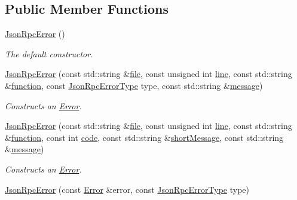 \subsection*{Public Member Functions}
\begin{DoxyCompactItemize}
\item 
\hyperlink{group___network_module_ga6177a0628073de16562fdbaf8ef12f33}{Json\+Rpc\+Error} ()
\begin{DoxyCompactList}\small\item\em The default constructor. \end{DoxyCompactList}\item 
\hyperlink{group___network_module_ga041044a45186dbc1faa970ec45ecba81}{Json\+Rpc\+Error} (const std\+::string \&\hyperlink{group___utility_module_ga0b75e32780cb8534179ff3c060739496}{file}, const unsigned int \hyperlink{group___utility_module_ga13437b5caffe754b7a32fc3c514907e5}{line}, const std\+::string \&\hyperlink{group___utility_module_gaa69c98222c56544a9094154a8eab4db9}{function}, const \hyperlink{namespacedg_1_1deepcore_1_1network_a396e76c62ff66c95c20af09d8e45ce44}{Json\+Rpc\+Error\+Type} type, const std\+::string \&\hyperlink{group___utility_module_ga7269ba8049ed86338733955565242539}{message})
\begin{DoxyCompactList}\small\item\em Constructs an \hyperlink{classdg_1_1deepcore_1_1_error}{Error}. \end{DoxyCompactList}\item 
\hyperlink{group___network_module_gad7b1e6630b2774ffa45cbcc88b9a1b3f}{Json\+Rpc\+Error} (const std\+::string \&\hyperlink{group___utility_module_ga0b75e32780cb8534179ff3c060739496}{file}, const unsigned int \hyperlink{group___utility_module_ga13437b5caffe754b7a32fc3c514907e5}{line}, const std\+::string \&\hyperlink{group___utility_module_gaa69c98222c56544a9094154a8eab4db9}{function}, const int \hyperlink{group___network_module_gab5f760ae09f901ed94e08ea1c0d26e50}{code}, const std\+::string \&\hyperlink{group___network_module_gab4cfbb46ab5f2ce706d08b5daf106263}{short\+Message}, const std\+::string \&\hyperlink{group___utility_module_ga7269ba8049ed86338733955565242539}{message})
\begin{DoxyCompactList}\small\item\em Constructs an \hyperlink{classdg_1_1deepcore_1_1_error}{Error}. \end{DoxyCompactList}\item 
\hyperlink{group___network_module_ga15642140f0fe7b5bc798cdd884954040}{Json\+Rpc\+Error} (const \hyperlink{classdg_1_1deepcore_1_1_error}{Error} \&error, const \hyperlink{namespacedg_1_1deepcore_1_1network_a396e76c62ff66c95c20af09d8e45ce44}{Json\+Rpc\+Error\+Type} type)

\end{DoxyCompactItemize}
